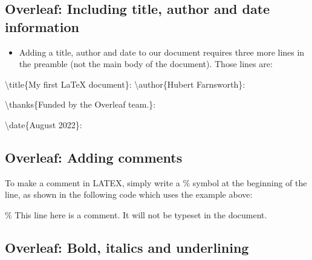 \documentclass[
  letterpaper,
  DIV=11,
  numbers=noendperiod]{scrartcl}
\newenvironment{Shaded}{\begin{snugshade}}{\end{snugshade}}
\newcommand{\CommentTok}[1]{\textcolor[rgb]{0.37,0.37,0.37}{#1}}
\newcommand{\FunctionTok}[1]{\textcolor[rgb]{0.28,0.35,0.67}{#1}}
\newcommand{\NormalTok}[1]{\textcolor[rgb]{0.00,0.23,0.31}{#1}}
\providecommand{\tightlist}{%
  \setlength{\itemsep}{0pt}\setlength{\parskip}{0pt}}\usepackage{longtable,booktabs,array}
\begin{document}
\subsection{Overleaf: Including title, author and date
information}\label{overleaf-including-title-author-and-date-information}

\begin{itemize}
\tightlist
\item
  Adding a title, author and date to our document requires three more
  lines in the preamble (not the main body of the document). Those lines
  are:
\end{itemize}

\begin{Shaded}
\begin{Highlighting}[]
\FunctionTok{\textbackslash{}title}\NormalTok{\{My first LaTeX document\}: }
\FunctionTok{\textbackslash{}author}\NormalTok{\{Hubert Farnsworth\}: }

\FunctionTok{\textbackslash{}thanks}\NormalTok{\{Funded by the Overleaf team.\}: }

\FunctionTok{\textbackslash{}date}\NormalTok{\{August 2022\}: }
\end{Highlighting}
\end{Shaded}

\subsection{Overleaf: Adding comments}\label{overleaf-adding-comments}

To make a comment in LATEX, simply write a {\%} symbol at the beginning
of the line, as shown in the following code which uses the example
above:

\begin{codelisting}

\caption{\texttt{Example Comment Line}}

\begin{Shaded}
\begin{Highlighting}[]
\CommentTok{\% This line here is a comment. It will not be typeset in the document.}
\end{Highlighting}
\end{Shaded}

\end{codelisting}

\subsection{Overleaf: Bold, italics and
underlining}\label{overleaf-bold-italics-and-underlining}
\end{document}
